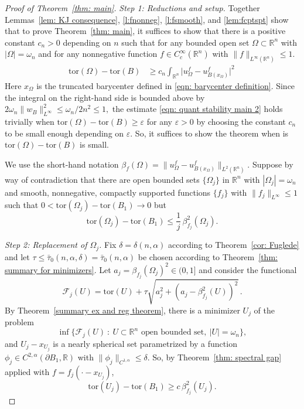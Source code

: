\documentclass[10pt,a4paper]{amsart}
\numberwithin{equation}{section}
\def\R{{\mathbb R}}
\def\e{\varepsilon}
\def\W{\Omega}
\def\om{\omega}
\def\tor{\mathrm{tor}}
\begin{document}
\begin{proof}[Proof of Theorem~\ref{thm: main}]

 {\it Step 1: Reductions and setup.}
Together Lemmas~\ref{lem: KJ consequence}, \ref{l:fnonneg}, \ref{l:fsmooth}, and \ref{lem:fcptspt} show that to prove Theorem~\ref{thm: main}, it suffices to show that there is a positive constant $c_{n}>0$ depending on $n$ such that for any bounded open set $\W \subset \R^n$ with $|\W| = \omega_n$ and for any nonnegative function $f \in C^\infty_c(\R^n)$ with $\|f\|_{L^{\infty}(\R^n)}\leq 1$.
\begin{align}
\label{eqn: quant stability main 2}
\tor(\W ) - \tor(B)  & \geq c_{n}\int_{\R^n} \big|u_{\W}^f - u_{B(x_\W)}^f\big|^2 \,
\end{align}
Here $x_\W$ is the truncated  barycenter defined in \eqref{eqn: barycenter definition}. Since the integral on the right-hand side is bounded above by $2\om_n\|w_B\|_{L^\infty}^2 \leq \om_n/2n^2 \leq 1,$ the estimate \eqref{eqn: quant stability main 2} holds trivially when $\tor(\W ) - \tor(B)\geq \e$ for any $\e>0$ by choosing the constant $c_{n}$ to be small enough depending on $\e$. So, it suffices to show the theorem when  is  $\tor(\W ) - \tor(B)$ is small.

We use the short-hand notation $\beta_f(\W) = \| u_\W^f - u_{B(x_\W)}^f\|_{L^2(\R^n)}$. 	Suppose by way of contradiction that there are open bounded sets $\{\W_j\}$ in $\R^n$ with $|\W_j| = \omega_n$ and  smooth, nonnegative, compactly supported functions  $\{f_j\}$ with $\| f_j\|_{L^{\infty}}\leq 1$ such that $0< \tor(\W_j)-\tor(B_1)\to 0$ but 
	\begin{equation}\label{e: sp contra}
		\tor(\W_j ) - \tor(B_1) \leq \frac{1}{j}\, \beta_{f_j}^2(\W_j). 
	\end{equation}



 {\it Step 2: Replacement of $\W_j$.}
Fix $\delta = \delta(n, \alpha)$ according to Theorem~\ref{cor: Fuglede} and let $\tau \leq  \bar{\tau}_0(n,\alpha,\delta) = \bar{\tau}_0(n,\alpha)$ be chosen according to Theorem~\ref{thm: summary for minimizers}.  Let $a_j = \beta_{f_j}(\W_j)^2 \in (0, 1]$ and consider the functional
	\[
\mathcal{F}_j(U) =	\tor(U) + \tau \sqrt{a_j^2 + (a_j -\beta^2_{f_j}(U))^2}\,.
	\]
By Theorem~\ref{summary ex and reg theorem}, there is a minimizer  $U_j$ of the problem
    	\begin{equation}
		\inf \{ \mathcal{F}_j(U) \ : \ U \subset \R^n \text{ open bounded set}, \ |U| = \omega_n\},
	\end{equation} 
and $U_j -x_{U_j}$ is a nearly spherical set parametrized by a function $\phi_j \in C^{2,\alpha}( \partial B_1, \R)$ with $\|\phi_j\|_{C^{1,\alpha}}\leq \delta.$ So, by Theorem~\ref{thm: spectral gap} applied with $f = f_j(\cdot -x_{U_j})$, 
	\begin{equation}\label{eqn: sp fuglede}
		\tor(U_j ) - \tor(B_1) \geq c\, \beta_{f_j}^2(U_j). 
	\end{equation}


\end{proof}
\end{document}
